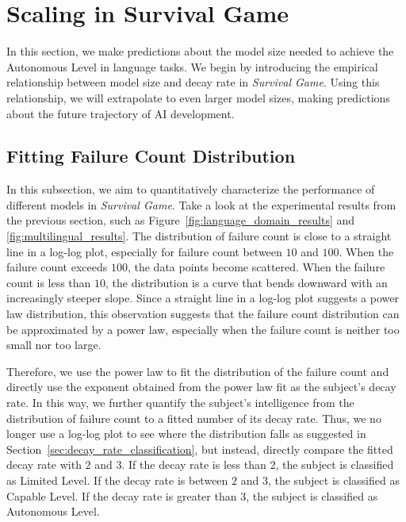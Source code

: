 \section{Scaling in Survival Game}
\label{sec:future_prediction}

In this section, we make predictions about the model size needed to achieve the Autonomous Level in language tasks. 
We begin by introducing the empirical relationship between model size and decay rate in \textit{Survival Game}. Using this relationship, we will extrapolate to even larger model sizes, making predictions about the future trajectory of AI development.


\subsection{Fitting Failure Count Distribution}
\label{sec:fit_failure_count_distribution}



In this subsection, we aim to quantitatively characterize the performance of different models in \textit{Survival Game}. Take a look at the experimental results from the previous section, such as Figure~\ref{fig:language_domain_results} and \ref{fig:multilingual_results}. The distribution of failure count is close to a straight line in a log-log plot, especially for failure count between $10$ and $100$. When the failure count exceeds $100$, the data points become scattered. When the failure count is less than $10$, the distribution is a curve that bends downward with an increasingly steeper slope. Since a straight line in a log-log plot suggests a power law distribution, this observation suggests that the failure count distribution can be approximated by a power law, especially when the failure count is neither too small nor too large.

Therefore, we use the power law to fit the distribution of the failure count and directly use the exponent obtained from the power law fit as the subject's decay rate. In this way, we further quantify the subject's intelligence from the distribution of failure count to a fitted number of its decay rate. Thus, we no longer use a log-log plot to see where the distribution falls as suggested in Section~\ref{sec:decay_rate_classification}, but instead, directly compare the fitted decay rate with $2$ and $3$. If the decay rate is less than $2$, the subject is classified as Limited Level. If the decay rate is between $2$ and $3$, the subject is classified as Capable Level. If the decay rate is greater than $3$, the subject is classified as Autonomous Level.

